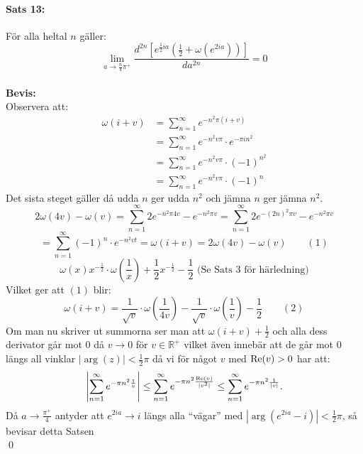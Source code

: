 \documentclass[a4paper,twoside]{article}%
\begin{document}
\paragraph{Sats 13:} För alla heltal $n$ gäller:
\[%
	\lim_{a \to \frac n 4 \pi^+} \frac {
		d^{2n} [
			e^{\frac 1 2 ia} (\frac 1 2 + \omega(e^{2ia}))
		]}
		{
			da^{2n}
		} = 0
\]
\\
{\bf Bevis:}\\
Observera att:
\newcommand{\mysum} {
	\sum_{n = 1}^\infty e^{-n^2 v \pi} \cdot
}
\begin{align*}
	\omega(i + v) &= \sum_{n = 1}^\infty e^{-n^2 \pi(i + v)} \\
		&= \mysum e^{-\pi i n^2} \\
		&= \mysum (- 1)^{n^2} \\
		&= \mysum (- 1)^n
\end{align*}
Det sista steget gäller då udda $n$ ger udda $n^2$ och jämna $n$ ger jämna $n^2$.
\[
	2 \omega(4v) - \omega(v) = \sum_{n = 1}^\infty 2 e^{-n^2 \pi 4 v} - e^{-n^2 \pi v} = \sum_{n = 1}^\infty 2
		e^{-(2n)^2\pi v} - e^{-n^2 \pi v} 
\]
\[
	= \sum_{n = 1}^\infty (-1)^n \cdot e^{-n^2 vt} = \omega(i + v) = 2 \omega(4 v) -
			\omega(v) \qquad (1)
\]
\[
	\omega(x) x^{- \frac 1 2} \cdot \omega(\frac 1 x) + \frac 1 2  x^{- \frac 1 2} - \frac 1 2 \text{ (Se Sats 3 för härledning)}
\]
Vilket ger att $(1)$ blir:
\[
	\omega(i + v) = \frac {1} {\sqrt v} \cdot \omega(\frac {1} {4v}) - \frac {1} {\sqrt v} \cdot \omega(\frac 1 v) - \frac 1 2
		\qquad (2)
\]
Om man nu skriver ut summorna ser man att $\omega(i + v) + \frac 1 2$ och alla dess derivator går
mot $0$ då $v \to 0$ för $v \in \mathbb{R}^+$
vilket även innebär att de går mot $0$ längs all vinklar $|\operatorname{arg}(z)| < \frac 1 2 \pi$ då vi för något $v$ med 
$\operatorname{Re}(v) > 0$ har att:
\[
	\left |
		 \sum_{n = 1}^\infty e^{-\pi n^2 \frac 1 v} 
	\right | \leq 
		\sum_{n = 1}^\infty e^{-\pi n^2 \frac {\operatorname{Re}(v)} {|v^2|}}
	\leq
		\sum_{n = 1}^\infty e^{-\pi n^2 \frac {1} {|v|}}.
\]
Då $a \to \frac {\pi^+} {4}$ antyder att $e^{2ia} \to i$ längs alla ``vägar''
med $|\operatorname{arg}(e^{2ia} - i) | < \frac 1 2 \pi$, så bevisar detta Satsen\\
\hfill \qed
\end{document}
